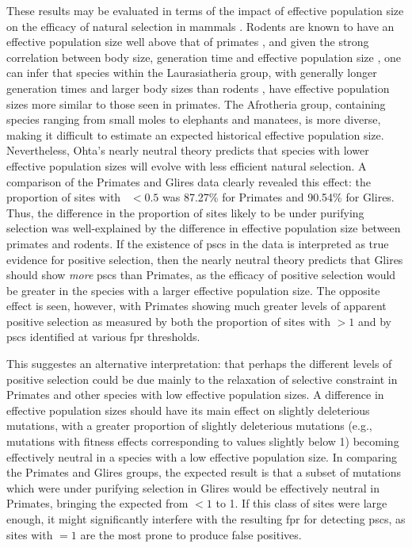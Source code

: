 These results may be evaluated in terms of the impact of effective
population size on the efficacy of natural selection in mammals
\citep{Popadin2007,Nikolaev2007,Ellegren2009}. Rodents are known to
have an effective population size well above that of primates
\citep{Kosiol2008}, and given the strong correlation between body
size, generation time and effective population size
\citep{Nikolaev2007}, one can infer that species within the
Laurasiatheria group, with generally longer generation times and
larger body sizes than rodents \citep{Hou2009}, have effective
population sizes more similar to those seen in primates. The
Afrotheria group, containing species ranging from small moles to
elephants and manatees, is more diverse, making it difficult to
estimate an expected historical effective population
size. Nevertheless, Ohta's nearly neutral theory \citep{Ohta1992}
predicts that species with lower effective population sizes will
evolve with less efficient natural selection. A comparison of the
Primates and Glires data clearly revealed this effect: the proportion
of sites with \omgml~$<0.5$ was 87.27\% for Primates and 90.54\% for
Glires. Thus, the difference in the proportion of sites likely to be
under purifying selection was well-explained by the difference in
effective population size between primates and rodents. If the
existence of \acp{psc} in the \sw data is interpreted as true evidence
for positive selection, then the nearly neutral theory predicts that
Glires should show \emph{more} \acp{psc} than Primates, as the
efficacy of positive selection would be greater in the species with a
larger effective population size. The opposite effect is seen,
however, with Primates showing much greater levels of apparent
positive selection as measured by both the proportion of sites with
\omgml$>1$ and by \acp{psc} identified at various \ac{fpr} thresholds.

This suggestes an alternative interpretation: that perhaps the
different levels of positive selection could be due mainly to the
relaxation of selective constraint in Primates and other species with
low effective population sizes. A difference in effective population
sizes should have its main effect on slightly deleterious mutations,
with a greater proportion of slightly deleterious mutations (e.g.,
mutations with fitness effects corresponding to \dnds values slightly
below 1) becoming effectively neutral in a species with a low
effective population size. In comparing the Primates and Glires
groups, the expected result is that a subset of mutations which were
under purifying selection in Glires would be effectively neutral in
Primates, bringing the expected \omg from $<1$ to 1. If this class of
sites were large enough, it might significantly interfere with the
resulting \ac{fpr} for detecting \acp{psc}, as sites with \omg$=1$ are
the most prone to produce false positives.


